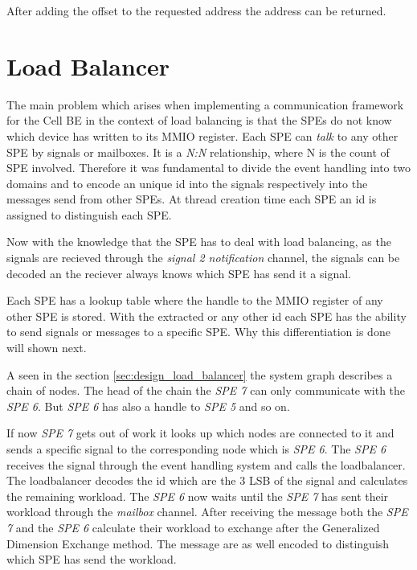 \documentclass[DIV10, abstracton, openright, footsepline, headsepline, twoside, 9pt,
bigheadings]{scrreprt}
\begin{document}
After adding the offset to the requested address the address can be returned.



\section{Load Balancer}
\label{sec:impl_load_balancer}
The main problem which arises when implementing a communication framework for the
Cell BE in the context of load balancing is that the SPEs do not know which device
has written to its MMIO register. Each SPE can \textit{talk} to any other SPE by signals
or mailboxes. It is a \textit{N:N} relationship, where N is the count of SPE involved.
Therefore it was fundamental to divide the event handling into two domains and to encode
an unique id into the signals respectively into the messages send from other SPEs.
At thread creation time each SPE an id is assigned to distinguish each SPE.

Now with the knowledge that the SPE has to deal with load balancing, as the signals
are recieved through the \textit{signal 2 notification} channel, the signals can be
decoded an the reciever always knows which SPE has send it a signal.

Each SPE has a lookup table where the handle to the MMIO register of any other SPE
is stored. With the extracted or any other id each SPE has the ability to send signals
or messages to a specific SPE. Why this differentiation is done will shown next.

A seen in the section \ref{sec:design_load_balancer} the system graph describes a chain
of nodes. The head of the chain the \textit{SPE 7} can only communicate with the
\textit{SPE 6}. But \textit{SPE 6} has also a handle to \textit{SPE 5} and so on.

If now \textit{SPE 7} gets out of work it looks up which nodes are connected to it and
sends a specific signal to the corresponding node which is \textit{SPE 6}. The
\textit{SPE 6} receives  the signal through the event handling system and calls
the loadbalancer.
The loadbalancer decodes the id which are the 3 LSB of the signal and calculates
the remaining workload. The \textit{SPE 6}  now waits until the \textit{SPE 7}
has sent their workload through the \textit{mailbox} channel. After receiving the
message both the \textit{SPE 7} and the \textit{SPE 6} calculate their workload
to exchange after the Generalized Dimension Exchange method. The message are as well
encoded to distinguish which SPE has send the workload.
\end{document}
